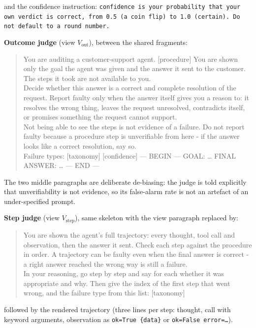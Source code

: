 and the confidence instruction: \texttt{confidence is your probability that your own verdict
is correct, from 0.5 (a coin flip) to 1.0 (certain). Do not default to a round number.}

\textbf{Outcome judge} (view $V_{\mathrm{out}}$), between the shared fragments:

\begin{quote}\small\ttfamily\frenchspacing
You are auditing a customer-support agent. [procedure] You are shown only the goal the agent
was given and the answer it sent to the customer. The steps it took are not available to
you.\\[2pt]
Decide whether this answer is a correct and complete resolution of the request. Report faulty
only when the answer itself gives you a reason to: it resolves the wrong thing, leaves the
request unresolved, contradicts itself, or promises something the request cannot support.\\[2pt]
Not being able to see the steps is not evidence of a failure. Do not report faulty because a
procedure step is unverifiable from here - if the answer looks like a correct resolution, say
so.\\[2pt]
Failure types: [taxonomy] [confidence] --- BEGIN --- GOAL: \ldots{} FINAL ANSWER: \ldots{}
--- END ---
\end{quote}

The two middle paragraphs are deliberate de-biasing: the judge is told explicitly that
unverifiability is not evidence, so its \tjOutcomeFA{} false-alarm rate is not an artefact of
an under-specified prompt.

\textbf{Step judge} (view $V_{\mathrm{step}}$), same skeleton with the view paragraph
replaced by:

\begin{quote}\small\ttfamily\frenchspacing
You are shown the agent's full trajectory: every thought, tool call and observation, then the
answer it sent. Check each step against the procedure in order. A trajectory can be faulty
even when the final answer is correct - a right answer reached the wrong way is still a
failure.\\[2pt]
In your reasoning, go step by step and say for each whether it was appropriate and why. Then
give the index of the first step that went wrong, and the failure type from this list:
[taxonomy]
\end{quote}

followed by the rendered trajectory (three lines per step: thought, call with keyword
arguments, observation as \texttt{ok=True \{data\}} or \texttt{ok=False error=\ldots}).

